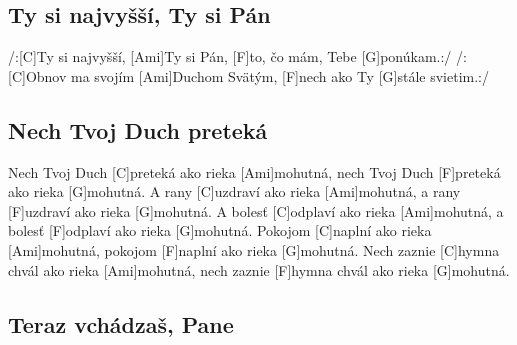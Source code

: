 \documentclass[10pt]{article}
\begin{document}
\begin{Large}
\begin{multicols}{2}
\begin{minipage}{\textwidth}
\subsection{Ty si najvyšší, Ty si Pán}
\begin{guitar}
	/:[C]Ty si najvyšší, [Ami]Ty si Pán,
	[F]to, čo mám, Tebe [G]ponúkam.:/
	/:[C]Obnov ma svojím [Ami]Duchom Svätým,
	[F]nech ako Ty [G]stále svietim.:/
\end{guitar}
\end{minipage}
\end{multicols}


\begin{minipage}{\textwidth}
\begin{multicols*}{2}
\subsection{Nech Tvoj Duch preteká}
\begin{guitar}
	Nech Tvoj Duch [C]preteká ako rieka [Ami]mohutná,
	nech Tvoj Duch [F]preteká ako rieka [G]mohutná.
	A rany [C]uzdraví ako rieka [Ami]mohutná,
	a rany [F]uzdraví ako rieka [G]mohutná.
	A bolesť [C]odplaví ako rieka [Ami]mohutná,
	a bolesť [F]odplaví ako rieka [G]mohutná.
	Pokojom [C]naplní ako rieka [Ami]mohutná,
	pokojom [F]naplní ako rieka [G]mohutná.
	Nech zaznie [C]hymna chvál ako rieka 
	[Ami]mohutná,
	nech zaznie [F]hymna chvál ako rieka 
	[G]mohutná.
\end{guitar}
\columnbreak
\subsection{Teraz vchádzaš, Pane}
\end{multicols*}
\end{minipage}

\begin{minipage}{\textwidth}

\end{minipage}
\end{Large}
\end{document}
